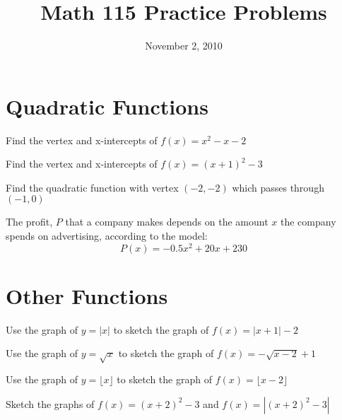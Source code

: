 \documentclass[fleqn,addpoints]{exam}
\title{Math 115 Practice Problems}
\date{November 2, 2010}
\begin{document}
\maketitle

\section{Quadratic Functions}

\begin{questions}

\question 
Find the vertex and x-intercepts of $f(x) = x^2 - x - 2$
\vspace{2.5 cm}

\question 
Find the vertex and x-intercepts of $f(x) = (x+1)^2 - 3$
\vspace{2.5 cm}

\question
Find the quadratic function with vertex $(-2, -2)$ which passes through $(-1, 0)$
\vspace{3 cm}

\question
The profit, $P$ that a company makes depends on the amount $x$ the company spends on advertising, according to the model:
\[
  P(x) = - 0.5x^2 + 20x + 230 
\]


\pagebreak

\section{Other Functions}

\question
Use the graph of $y = |x|$ to sketch the graph of $f(x) = |x+1| - 2$

\vspace{4 cm}

\question
Use the graph of $y = \sqrt{x}$ to sketch the graph of $f(x) = -\sqrt{x-2} + 1$
\vspace{4 cm}

\question
Use the graph of $y = \lfloor x \rfloor$ to sketch the graph of $f(x) = \lfloor x-2 \rfloor$
\vspace{4 cm}

\question
Sketch the graphs of $f(x) = (x+2)^2 - 3$ and $f(x) = |(x+2)^2 - 3|$
\vspace{4 cm}

\end{questions}
\end{document}
